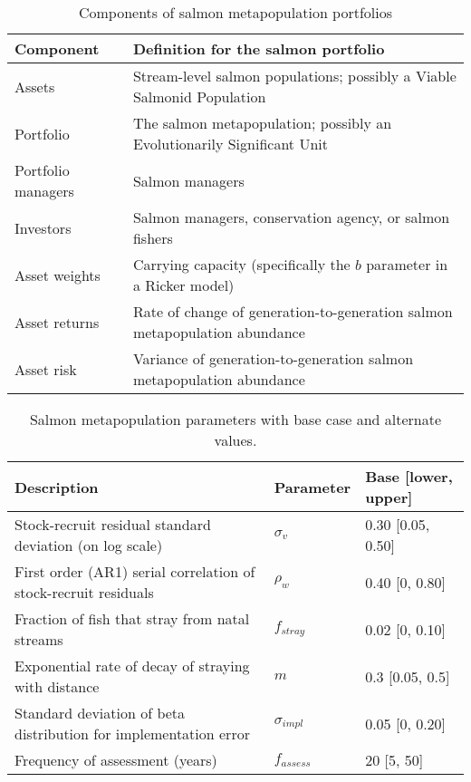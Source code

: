 \begin{table}[h!]
\centering
\small
\caption{Components of salmon metapopulation portfolios}
\begin{tabular}{p{3.6cm}p{7.5cm}}
\toprule
Component & Definition for the salmon portfolio\\
\midrule
Assets             & Stream-level salmon populations; possibly a Viable
                     Salmonid Population\\
Portfolio          & The salmon metapopulation; possibly an Evolutionarily
                     Significant Unit\\
Portfolio managers & Salmon managers\\
Investors          & Salmon managers, conservation agency, or salmon fishers\\
Asset weights      & Carrying capacity (specifically the $b$ parameter in
                     a Ricker model)\\
Asset returns      & Rate of change of generation-to-generation salmon
                     metapopulation abundance\\
Asset risk         & Variance of generation-to-generation salmon metapopulation
                     abundance\\
\bottomrule
\end{tabular}
\label{tab:port-components}
\end{table}

\clearpage

\begin{table}[h!]
\centering
\small
\caption{Salmon metapopulation parameters with base case and alternate values.}
\begin{tabular}{p{7.0cm}p{1.6cm}p{3.2cm}}
\toprule
Description                                                      & Parameter       & Base [lower, upper] \\
\midrule
Stock-recruit residual standard deviation (on log scale)         & $\sigma_v$      & 0.30 [0.05, 0.50] \\
First order (AR1) serial correlation of stock-recruit residuals  & $\rho_w$        & 0.40 [0, 0.80] \\
Fraction of fish that stray from natal streams                   & $f_{stray}$     & 0.02 [0, 0.10] \\
Exponential rate of decay of straying with distance              & $m$             & 0.3 [0.05, 0.5] \\
Standard deviation of beta distribution for implementation error & $\sigma_{impl}$ & 0.05 [0, 0.20] \\
Frequency of assessment (years)                                  & $f_{assess}$    & 20 [5, 50] \\
\bottomrule
\end{tabular}
\label{tab:salm-pars}
\end{table}

